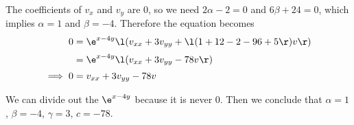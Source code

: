 \documentclass[a4paper]{article}
\begin{document}
The coefficients of $v_x$ and $v_y$ are 0, so we need $2\alpha - 2 = 0$ and $6\beta + 24 = 0$, which implies $\alpha = 1$ and $\beta = -4$. Therefore the equation becomes
\begin{align*}
0 &= \e^{x - 4y} \l(
    v_{xx} + 3 v_{yy}
    + \l( 1 + 12 - 2 - 96 + 5 \r) v
\r) \\[0.5ex]
&= \e^{x - 4y} \l(
    v_{xx} + 3 v_{yy}
    - 78 v
\r) \\[0.5ex]
\implies 0 &= v_{xx} + 3 v_{yy} - 78 v
\end{align*}

We can divide out the $\e^{x - 4y}$ because it is never 0. Then we conclude that $\alpha = 1$, $\beta = -4$, $\gamma = 3$, $c = -78$.

\end{document}
